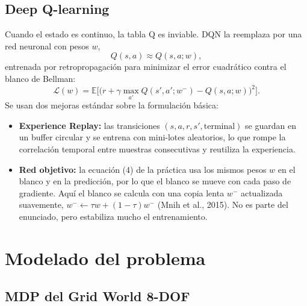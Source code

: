 \documentclass[11pt]{article}
\begin{document}
\subsection{Deep Q-learning}

Cuando el estado es continuo, la tabla Q es inviable. DQN la reemplaza por una
red neuronal con pesos $w$,
\begin{equation}
Q(s,a) \approx Q(s,a; w),
\label{eq:aprox}
\end{equation}
entrenada por retropropagación para minimizar el error cuadrático contra el
blanco de Bellman:
\begin{equation}
\mathcal{L}(w) = \mathbb{E}\Big[\big(r + \gamma \max_{a'} Q(s',a'; w^-) - Q(s,a;w)\big)^2\Big].
\label{eq:loss}
\end{equation}
Se usan dos mejoras estándar sobre la formulación básica:
\begin{itemize}
    \item \textbf{Experience Replay:} las transiciones $(s, a, r, s', \text{terminal})$
    se guardan en un buffer circular y se entrena con mini-lotes aleatorios, lo
    que rompe la correlación temporal entre muestras consecutivas y reutiliza la
    experiencia.
    \item \textbf{Red objetivo:} la ecuación (4) de la práctica usa los mismos
    pesos $w$ en el blanco y en la predicción, por lo que el blanco se mueve con
    cada paso de gradiente. Aquí el blanco se calcula con una copia lenta $w^-$
    actualizada suavemente, $w^- \leftarrow \tau w + (1-\tau) w^-$ (Mnih et al.,
    2015). No es parte del enunciado, pero estabiliza mucho el entrenamiento.
\end{itemize}

\section{Modelado del problema}

\subsection{MDP del Grid World 8-DOF}
\end{document}

